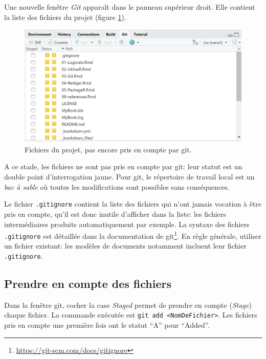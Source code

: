 \documentclass[
  12pt,
  french,
  a4paper,
  extrafontsizes,onecolumn,openright
  ]{memoir}
\begin{document}
\normalsize

Une nouvelle fenêtre \emph{Git} apparaît dans le panneau supérieur droit.
Elle contient la liste des fichiers du projet (figure \ref{fig:git-Fichiers}).



\scriptsize

\begin{figure}

{\centering \includegraphics[width=0.8\linewidth]{images/git-Fichiers} 

}

\caption{Fichiers du projet, pas encore pris en compte par git.}\label{fig:git-Fichiers}
\end{figure}

\normalsize

A ce stade, les fichiers ne sont pas pris en compte par git: leur statut est un double point d'interrogation jaune.
Pour git, le répertoire de travail local est un \emph{bac à sable} où toutes les modifications sont possibles sans conséquences.

Le fichier \texttt{.gitignore} contient la liste des fichiers qui n'ont jamais vocation à être pris en compte, qu'il est donc inutile d'afficher dans la liste: les fichiers intermédiaires produits automatiquement par exemple.
La syntaxe des fichiers \texttt{.gitignore} est détaillée dans la documentation de git\footnote{\url{https://git-scm.com/docs/gitignore}}.
En règle générale, utiliser un fichier existant: les modèles de documents notamment incluent leur fichier \texttt{.gitignore}.

\subsection{Prendre en compte des fichiers}\label{prendre-en-compte-des-fichiers}

Dans la fenêtre git, cocher la case \emph{Staged} permet de prendre en compte (\emph{Stage}) chaque fichier.
La commande exécutée est \texttt{git\ add\ \textless{}NomDeFichier\textgreater{}}.
Les fichiers pris en compte une première fois ont le statut \enquote{A} pour \enquote{Added}.
\end{document}
